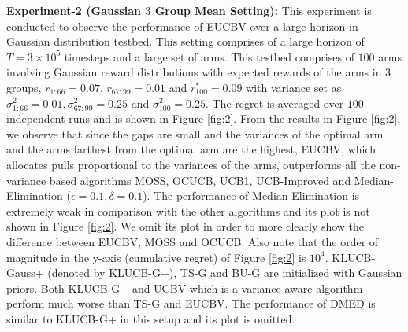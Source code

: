 \textbf{Experiment-2 (Gaussian $3$ Group Mean Setting):} This experiment is conducted to observe the performance of EUCBV over a large horizon in Gaussian distribution testbed. This setting comprises of a large horizon of $T = 3\times 10^{5}$ timesteps and a large set of arms. This testbed comprises of $100$ arms involving Gaussian reward distributions with expected rewards of the arms in $3$ groups, $r_{1:66}=0.07$, $r_{67:99}=0.01$ and $r^{*}_{100}=0.09$ with variance set as $\sigma_{1:66}^{2} = 0.01,\sigma_{67:99}^{2} = 0.25$ and $\sigma^{2}_{100}=0.25$. The regret is averaged over $100$ independent runs and is shown in Figure \ref{fig:2}. From the results in Figure \ref{fig:2}, we observe that since the gaps are small and the variances of the optimal arm and the arms farthest from the optimal arm are the highest, EUCBV, which allocates pulls proportional to the variances of the arms, outperforms all the non-variance based algorithms MOSS, OCUCB, UCB1, UCB-Improved and Median-Elimination ($\epsilon=0.1,\delta=0.1$). The performance of Median-Elimination is extremely weak in comparison with the other algorithms and its plot is not shown in Figure \ref{fig:2}. We omit its plot in order to more clearly show the difference between EUCBV, MOSS and OCUCB. Also note that the order of magnitude in the y-axis (cumulative regret) of Figure \ref{fig:2} is $10^4$. KLUCB-Gauss+ (denoted by KLUCB-G+), TS-G and BU-G are initialized with Gaussian priors. Both KLUCB-G+ and UCBV which is a variance-aware algorithm perform much worse than TS-G and EUCBV. The performance of DMED is similar to KLUCB-G+ in this setup and its plot is omitted. 


